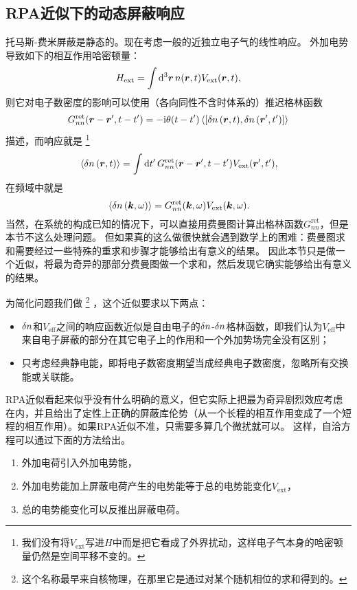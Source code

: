 \subsection{RPA近似下的动态屏蔽响应}\label{sec:rpa-semi-classical-dynamical}

托马斯-费米屏蔽是静态的。现在考虑一般的近独立电子气的线性响应。
外加电势导致如下的相互作用哈密顿量：
\[
    {H}_\text{ext} = \int \dd[3]{\vb*{r}} {n}(\vb*{r}, t) V_\text{ext} (\vb*{r}, t),
\]
则它对电子数密度的影响可以使用（各向同性不含时体系的）推迟格林函数
\[
    G^\text{ret}_{nn}(\vb*{r}-\vb*{r}', t-t') = - \ii \theta(t-t') \expval*{\comm{\var{{n}}(\vb*{r}, t)}{\var{{n}}(\vb*{r}', t')}}
\]
描述，而响应就是%
\footnote{我们没有将$V_\text{ext}$写进${H}$中而是把它看成了外界扰动，这样电子气本身的哈密顿量仍然是空间平移不变的。}%
\begin{equation}
    \expval*{\var{{n}}(\vb*{r}, t)} = \int \dd{t'} G^\text{ret}_{nn}(\vb*{r}-\vb*{r}', t-t') V_\text{ext}(\vb*{r}', t'),
\end{equation}
在频域中就是
\begin{equation}
    \expval*{\var{{n}}(\vb*{k}, \omega)} = G^\text{ret}_{nn}(\vb*{k}, \omega) V_\text{ext}(\vb*{k}, \omega).
    \label{eq:green-function-electro-shielding}
\end{equation}
当然，在系统的构成已知的情况下，可以直接用费曼图计算出格林函数$G^\text{ret}_{nn}$，但是本节不这么处理问题。
但如果真的这么做很快就会遇到数学上的困难：费曼图求和需要经过一些特殊的重求和步骤才能够给出有意义的结果。
因此本节只是做一个近似，将最为奇异的那部分费曼图做一个求和，然后发现它确实能够给出有意义的结果。

为简化问题我们做%
\footnote{这个名称最早来自核物理，在那里它是通过对某个随机相位的求和得到的。}%
，这个近似要求以下两点：
\begin{itemize}
    \item $\var{{n}}$和$V_\text{eff}$之间的响应函数近似是自由电子的$\var{{n}}$-$\var{{n}}$格林函数，即我们认为$V_\text{eff}$中来自电子屏蔽的部分在其它电子上的作用和一个外加势场完全没有区别；
    \item 只考虑经典静电能，即将电子数密度期望当成经典电子数密度，忽略所有交换能或关联能。
\end{itemize}
RPA近似看起来似乎没有什么明确的意义，但它实际上把最为奇异剧烈效应考虑在内，并且给出了定性上正确的屏蔽库伦势（从一个长程的相互作用变成了一个短程的相互作用）。如果RPA近似不准，只需要多算几个微扰就可以。
这样，自洽方程可以通过下面的方法给出。
\begin{enumerate}
    \item 外加电荷引入外加电势能，
    \item 外加电势能加上屏蔽电荷产生的电势能等于总的电势能变化$V_\text{ext}$，
    \item 总的电势能变化可以反推出屏蔽电荷。
\end{enumerate}

